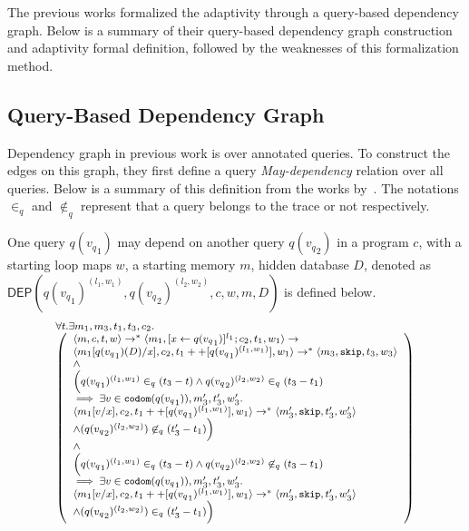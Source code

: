 The previous works formalized the adaptivity through a query-based dependency graph.
Below is a summary of their query-based dependency graph construction and adaptivity formal definition, followed
by the weaknesses of this formalization method.
\subsection{Query-Based Dependency Graph}
Dependency graph in previous work is over annotated queries.
To construct the edges on this graph, they first
define a query \emph{May-dependency} relation over all queries. Below is a summary of this definition from the
works by~\cite{weihao22}.
The notations $\in_q$ and $\not\in_q$ represent that a query belongs to the trace or not respectively.

\begin{defn}
One query $q({v_q}_1)$ may depend on another query $q({v_q}_2)$ in a program $c$, with a starting loop maps $w$, a starting memory $m$, hidden database $D$, denoted as \\
$\mathsf{DEP}(q({v_q}_1)^{(l_1, w_1)}, q({v_q}_2)^{(l_2, w_2)}, c,w, m, D)$ is defined below. 
\[
 {\footnotesize
\begin{array}{l}
\forall t. \exists m_1,m_3,t_1,t_3,c_2.\\
 \left (\begin{array}{l} 
\config{m, c, t,w} \rightarrow^{*} \config{m_1, [\assign{x}{q({v_q}_1)}]^{l_1} ; c_2,
 t_1,w_1} \rightarrow \\ \config{m_1[q({v_q}_1)(D)/x], c_2,
 t_1++[q({v_q}_1)^{(l_1, w_1)}], w_1} \rightarrow^{*} \config{m_3, \eskip,
 t_3,w_3} \\ 
 \land \\
\Big( q({v_q}_1)^{(l_1,w_1)} \in_{q} (t_3-t) \land q({v_q}_2)^{(l_2,w_2)} \in_{q} (t_3-t_1) \\ \implies \exists v \in \codom(q({v_q}_1)), m_3', t_3', w_3'. \\
 \config{m_1[v/x], {c_2}, t_1++[q({v_q}_1)^{(l_1,w_1)}], w_1} \rightarrow^{*} \config{m_3', \eskip, t_3', w_3'} \\ \land (q({v_q}_2)^{(l_2,w_2)}) \not \in_{q} (t_3'-t_1)
\Big)\\
\land \\
\Big(q({v_q}_1)^{(l_1,w_1)} \in_{q} (t_3-t) \land q({v_q}_2)^{(l_2,w_2)} \not\in_{q} (t_3-t_1) \\ \implies \exists v \in \codom(q({v_q}_1)), m_3', t_3', w_3'. \\
 \config{m_1[v/x], {c_2}, t_1++[q({v_q}_1)^{(l_1,w_1)}], w_1} \rightarrow^{*} \config{m_3', \eskip, t_3', w_3'} \\ \land (q({v_q}_2)^{(l_2,w_2)}) \in_{q} (t_3'-t_1)
\Big)
\end{array} \right )
\end{array}
}
\]
\end{defn}
